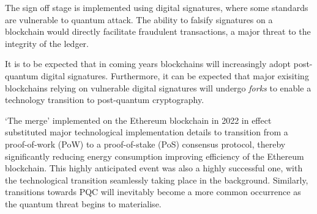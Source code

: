 The sign off stage is implemented using digital signatures, where some standards are vulnerable to quantum attack. The ability to falsify signatures on a blockchain would directly facilitate fraudulent transactions, a major threat to the integrity of the ledger.

It is to be expected that in coming years blockchains will increasingly adopt post-quantum digital signatures. Furthermore, it can be expected that major exisiting blockchains relying on vulnerable digital signatures will undergo \emph{forks} to enable a technology transition to post-quantum cryptography.

`The merge' implemented on the Ethereum blockchain in 2022 in effect substituted major technological implementation details to transition from a proof-of-work (PoW) to a proof-of-stake (PoS) consensus protocol, thereby significantly reducing energy consumption improving efficiency of the Ethereum blockchain. This highly anticipated event was also a highly successful one, with the technological transition seamlessly taking place in the background. Similarly, transitions towards PQC will inevitably become a more common occurrence as the quantum threat begins to materialise.

